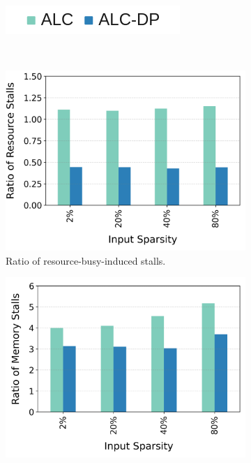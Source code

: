 \begin{figure}[htbp]
  \centering
 \begin{subfigure}{4cm}
    \centering
    \includegraphics[width=\textwidth]{Figures/Evaluations/Legend.png}
 \end{subfigure}\\
  \begin{subfigure}{.5\textwidth}
    \centering
    \includegraphics[width=\textwidth, height=.28\textheight]{Figures/Evaluations/if_then_else_few_scatter_resource_stalls.png}
    \caption{Ratio of resource-busy-induced stalls.}
    \label{fig:if-then-else-few-scatter-resource-stalls}
  \end{subfigure}%
  \begin{subfigure}{.5\textwidth}
        \centering
    \includegraphics[width=\textwidth, height=.28\textheight]{Figures/Evaluations/if_then_else_few_scatter_mem_stalls.png}

\end{subfigure}
\end{figure}
